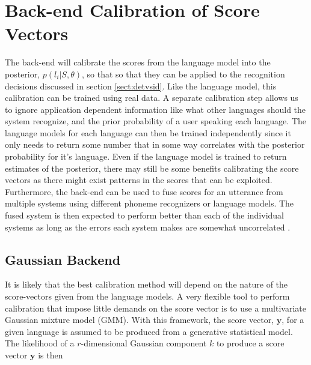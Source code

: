 \section{Back-end Calibration of Score Vectors}
\label{sect:backendscoring}

The back-end will calibrate the scores from the language model into the posterior, $p(l_i | S, \theta)$, so that so that they can be applied to the recognition decisions discussed in section \ref{sect:detvsid}. Like the language model, this calibration can be trained using real data. A separate calibration step allows us to ignore application dependent information like what other languages should the system recognize, and the prior probability of a user speaking each language. The language models for each language can then be trained independently since it only needs to return some number that in some way correlates with the posterior probability for it's language. Even if the language model is trained to return estimates of the posterior, there may still be some benefits calibrating the score vectors \cite[820]{lidbok} as there might exist patterns in the scores that can be exploited. Furthermore, the back-end can be used to fuse scores for an utterance from multiple systems using different phoneme recognizers or language models. The fused system is then expected to perform better than each of the individual systems as long as the errors each system makes are somewhat uncorrelated \cite[818]{lidbok}.

\subsection{Gaussian Backend}
\label{sect:gmmscore}

It is likely that the best calibration method will depend on the nature of the score-vectors given from the language models. A very flexible tool to perform calibration that impose little demands on the score vector is to use a multivariate Gaussian mixture model (GMM). With this framework, the score vector, $\mathbf{y}$, for a given language is assumed to be produced from a generative statistical model. The likelihood of a $r$-dimensional Gaussian component $k$ to produce a score vector $\mathbf{y}$ is then

